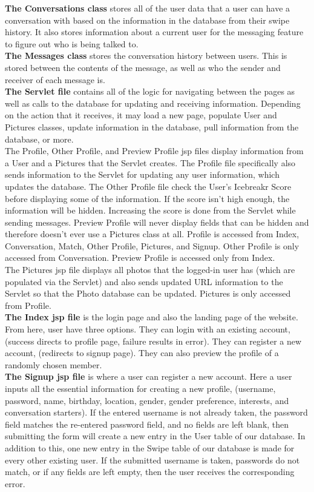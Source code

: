\documentclass{article}
\begin{document}
\begin{enumerate}
        \textbf{The Conversations class} stores all of the user data that a user can have a conversation with based on the information in the database from their swipe history. It also stores information about a current user for the messaging feature to figure out who is being talked to.\\
        \textbf{The Messages class} stores the conversation history between users. This is stored between the contents of the message, as well as who the sender and receiver of each message is.\\
        \textbf{The Servlet file} contains all of the logic for navigating between the pages as well as calls to the database for updating and receiving information. Depending on the action that it receives, it may load a new page, populate User and Pictures classes, update information in the database, pull information from the database, or more.\\
        The Profile, Other Profile, and Preview Profile jsp files display information from a User and a Pictures that the Servlet creates. The Profile file specifically also sends information to the Servlet for updating any user information, which updates the database. The Other Profile file check the User's Icebreakr Score before displaying some of the information. If the score isn't high enough, the information will be hidden. Increasing the score is done from the Servlet while sending messages. Preview Profile will never display fields that can be hidden and therefore doesn't ever use a Pictures class at all. Profile is accessed from Index, Conversation, Match, Other Profile, Pictures, and Signup. Other Profile is only accessed from Conversation. Preview Profile is accessed only from Index.\\
        The Pictures jsp file displays all photos that the logged-in user has (which are populated via the Servlet) and also sends updated URL information to the Servlet so that the Photo database can be updated. Pictures is only accessed from Profile.\\
         \textbf{The Index jsp file} is the login page and also the landing page of the website. From here, user have three options. They can login with an existing account, (success directs to profile page, failure results in error). They can register a new account, (redirects to signup page). They can also preview the profile of a randomly chosen member.\\
         \textbf{The Signup jsp file} is where a user can register a new account. Here a user inputs all the essential information for creating a new profile, (username, password, name, birthday, location, gender, gender preference, interests, and conversation starters). If the entered username is not already taken, the password field matches the re-entered password field, and no fields are left blank, then submitting the form will create a new entry in the User table of our database. In addition to this, one new entry in the Swipe table of our database is made for every other existing user. If the submitted username is taken, passwords do not match, or if any fields are left empty, then the user receives the corresponding error.\\

\end{enumerate}
\end{document}
